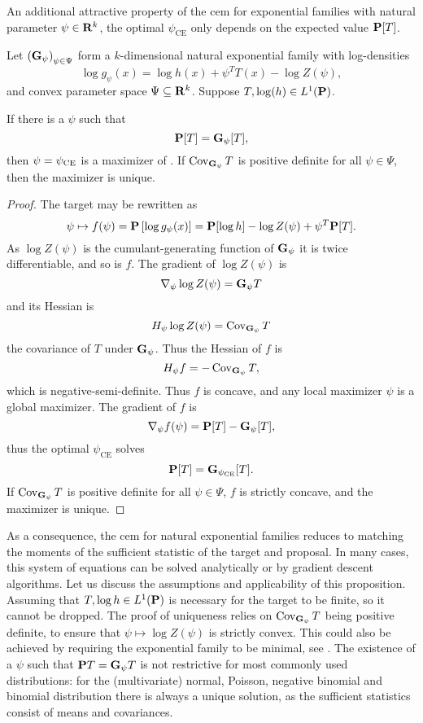 An additional attractive property of the \gls{cem} for exponential families with natural parameter $\psi \in \R^{k}$, the optimal $\psi_{\text{CE}}$ only depends on the expected value $\P [T]$. 

\begin{proposition}
    \label{prop:cem_exponential_families}
    Let $\left( \G_{\psi} \right)_{\psi \in \Psi}$ form a $k$-dimensional natural exponential family with log-densities 
    $$
    \log g_{\psi}(x) = \log h(x) + \psi^{T} T(x) - \log Z(\psi),
    $$
    and convex parameter space $\Psi \subseteq \R^{k}$. 
    Suppose $T, \log (h) \in L^{1}(\P)$.

    If there is a $\psi$ such that 
    $$
    \P[T] = \G_{\psi} [T],
    $$
    then $\psi = \pce$ is a maximizer of . If $\cov_{\G_{\psi}} T$ is positive definite for all $\psi\in\Psi$, then the maximizer is unique.
\end{proposition}

\begin{proof}
    The target may be rewritten as
    $$
    \psi \mapsto f(\psi) = \P \left[\log g_{\psi}(x)\right]= \P [\log h] - \log Z(\psi) + \psi^{T} \P [T].
    $$
    As $\log Z(\psi)$ is the cumulant-generating function of $\G_{\psi}$ it is twice differentiable, and so is $f$. The gradient of $\log Z(\psi)$ is 
    $$
    \nabla_{\psi} \log Z(\psi) = \G_{\psi} T
    $$
    and its Hessian is 
    $$
    H_{\psi} \log Z(\psi) = \cov_{\G_{\psi}} T
    $$
    the covariance of $T$ under $\G_{\psi}$. Thus the Hessian of $f$ is 
    $$
    H_{\psi} f = - \cov_{\G_{\psi}} T,
    $$
    which is negative-semi-definite. Thus $f$ is concave, and any local maximizer $\psi$ is a global maximizer. The gradient of $f$ is 
    $$
        \nabla_{\psi} f(\psi) = \P[T] - \G_{\psi} [T],
    $$
    thus the optimal $\psi_{\text{CE}}$ solves
    $$
    \P[T] = \G_{\pce}[T].
    $$
    If $\cov_{\G_{\psi}} T$ is positive definite for all $\psi \in \Psi$, $f$ is strictly concave, and the maximizer is unique.
\end{proof}
As a consequence, the \acrshort{cem} for natural exponential families reduces to matching the moments of the sufficient statistic of the target and proposal.
In many cases, this system of equations can be solved analytically or by gradient descent algorithms.
Let us discuss the assumptions and applicability of this proposition. Assuming that $T, \log h \in L^{1}(\P)$ is necessary for the target to be finite, so it cannot be dropped. The proof of uniqueness relies on $\cov_{\G_{\psi}} T$ being positive definite, to ensure that $\psi \mapsto \log Z(\psi)$ is strictly convex. This could also be achieved by requiring the exponential family to be minimal, see \citep[Theorem 1.13 (iv)]{Brown1986Fundamentals}. The existence of a $\psi$ such that $\P T = \G_{\psi} T$ is not restrictive for most commonly used distributions: for the (multivariate) normal, Poisson, negative binomial and binomial distribution there is always a unique solution, as the sufficient statistics consist of means and covariances. 

